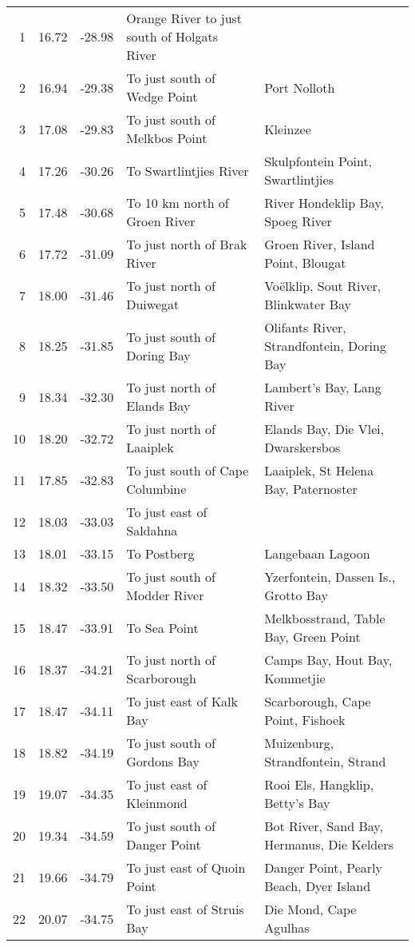 \documentclass[10pt,A4,]{article}
\begin{document}
\begin{tiny}
\begin{center}
\begin{longtable}{|r|r|r|l|p{6cm}|}
1 & 16.72 & -28.98 & Orange River to just south of Holgats River  &  \\
2 & 16.94 & -29.38 & To just south of Wedge Point & Port Nolloth \\
3 & 17.08 & -29.83 & To just south of Melkbos Point & Kleinzee \\
4 & 17.26 & -30.26 & To Swartlintjies River & Skulpfontein Point, Swartlintjies \\
5 & 17.48 & -30.68 & To 10 km north of Groen River  & River Hondeklip Bay, Spoeg River \\
6 & 17.72 & -31.09 & To just north of Brak River & Groen River, Island Point, Blougat \\
7 & 18.00 & -31.46 & To just north of Duiwegat & Voëlklip, Sout River, Blinkwater Bay \\
8 & 18.25 & -31.85 & To just south of Doring Bay & Olifants River, Strandfontein, Doring Bay \\
9 & 18.34 & -32.30 & To just north of Elands Bay & Lambert’s Bay, Lang River \\
10 & 18.20 & -32.72 & To just north of Laaiplek & Elands Bay, Die Vlei, Dwarskersbos \\
11 & 17.85 & -32.83 & To just south of Cape Columbine & Laaiplek, St Helena Bay, Paternoster \\
12 & 18.03 & -33.03 & To just east of Saldahna &  \\
13 & 18.01 & -33.15 & To Postberg & Langebaan Lagoon \\
14 & 18.32 & -33.50 & To just south of Modder River & Yzerfontein, Dassen Is., Grotto Bay \\
15 & 18.47 & -33.91 & To Sea Point & Melkbosstrand, Table Bay, Green Point \\
16 & 18.37 & -34.21 & To just north of Scarborough & Camps Bay, Hout Bay, Kommetjie \\
17 & 18.47 & -34.11 & To just east of Kalk Bay & Scarborough, Cape Point, Fishoek \\
18 & 18.82 & -34.19 & To just south of Gordons Bay & Muizenburg, Strandfontein, Strand \\
19 & 19.07 & -34.35 & To just east of Kleinmond & Rooi Els, Hangklip, Betty’s Bay \\
20 & 19.34 & -34.59 & To just south of Danger Point & Bot River, Sand Bay, Hermanus, Die Kelders \\
21 & 19.66 & -34.79 & To just east of Quoin Point & Danger Point, Pearly Beach, Dyer Island \\
22 & 20.07 & -34.75 & To just east of Struis Bay & Die Mond, Cape Agulhas \\

\end{longtable}
\end{center}
\end{tiny}
\end{document}
